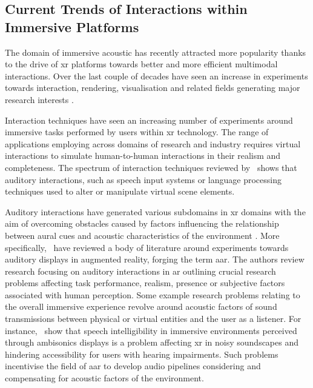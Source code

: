 \subsection{Current Trends of Interactions within Immersive Platforms}
The domain of immersive acoustic has recently attracted more popularity thanks to the drive of \acrshort{xr} platforms towards better and more efficient multimodal interactions. Over the last couple of decades have seen an increase in experiments towards interaction, rendering, visualisation and related fields generating major research interests \citep{kim2018revisiting}.\par
Interaction techniques have seen an increasing number of experiments around immersive tasks performed by users within \acrshort{xr} technology. The range of applications employing  across domains of research and industry requires virtual interactions to simulate human-to-human interactions in their realism and completeness. The spectrum of interaction techniques reviewed by~\cite{spittle2022review} shows that auditory interactions, such as speech input systems or language processing techniques used to alter or manipulate virtual scene elements.\par
Auditory interactions have generated various subdomains in \acrshort{xr} domains with the aim of overcoming obstacles caused by factors influencing the relationship between aural cues and acoustic characteristics of the environment \citep{park2022metaverse}.
More specifically,~\cite{yang2022audio} have reviewed a body of literature around experiments towards auditory displays in augmented reality, forging the term \acrfull{aar}. The authors review research focusing on auditory interactions in \acrshort{ar} outlining crucial research problems affecting task performance, realism, presence or subjective factors associated with human perception. Some example research problems relating to the overall immersive experience revolve around acoustic factors of sound transmissions between physical or virtual entities and the user as a listener. For instance,~\cite{mansour2021speech} show that speech intelligibility in immersive environments perceived through ambisonics displays is a problem affecting \acrshort{xr} in noisy soundscapes and hindering accessibility for users with hearing impairments. Such problems incentivise the field of \acrshort{aar} to develop audio pipelines considering and compensating for acoustic factors of the environment.\par

